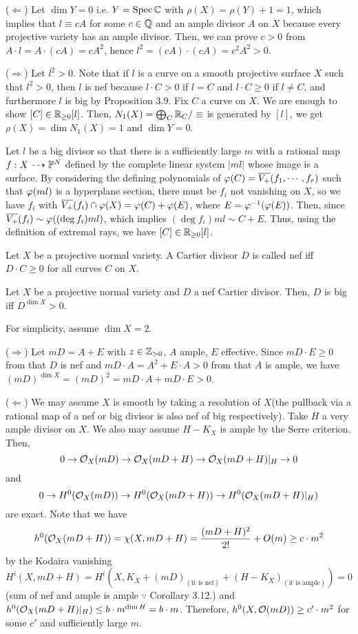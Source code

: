 \documentclass{../../small}
\begin{document}
\begin{pf}
($\Leftarrow$)
Let $\dim Y=0$ i.e. $Y=\Spec\C$ with $\rho(X)=\rho(Y)+1=1$, which implies that $l\equiv cA$ for some $c\in\Q$ and an ample divisor $A$ on $X$ because every projective variety has an ample divisor.
Then, we can prove $c>0$ from $A\cdot l=A\cdot(cA)=cA^2$, hence $l^2=(cA)\cdot(cA)=c^2A^2>0$.

($\Rightarrow$)
Let $l^2>0$.
Note that if $l$ is a curve on a smooth projective surface $X$ such that $l^2>0$, then $l$ is nef because $l\cdot C>0$ if $l=C$ and $l\cdot C\ge0$ if $l\ne C$, and furthermore $l$ is big by Proposition 3.9.
Fix $C$ a curve on $X$.
We are enough to show $[C]\in\R_{\ge0}[l]$.
Then, $N_1(X)=\bigoplus_C\R_C/\equiv$ is generated by $[l]$, we get $\rho(X)=\dim N_1(X)=1$ and $\dim Y=0$.

Let $l$ be a big divisor so that there is a sufficiently large $m$ with a rational map $f:X\dashrightarrow\P^N$ defined by the complete linear system $|ml|$ whose image is a surface.
By considering the defining polynomials of $\f(C)=\bar{V_+}(f_1,\cdots,f_r)$ such that $\f(ml)$ is a hyperplane section, there must be $f_i$ not vanishing on $X$, so we have $f_i$ with $\bar{V_+}(f_i)\cap\f(X)=\f(C)+\f(E)$, where $E=\f^{-1}(\f(E))$.
Then, since $\bar{V_+}(f_i)\sim\f((\deg f_i)ml)$, which implies $(\deg f_i)ml\sim C+E$.
Thus, using the definition of extremal rays, we have $[C]\in\R_{\ge0}[l]$.
\end{pf}

\setcounter{thm}{7}
\begin{defn}
Let $X$ be a projective normal variety.
A Cartier divisor $D$ is called nef iff $D\cdot C\ge0$ for all curves $C$ on $X$.
\end{defn}
\begin{prop}
Let $X$ be a projective normal variety and $D$ a nef Cartier divisor.
Then, $D$ is big iff $D^{\dim X}>0$.
\end{prop}


\begin{pf}
For simplicity, assume $\dim X=2$.

($\Rightarrow$)
Let $mD=A+E$ with $z\in\Z_{>0}$, $A$ ample, $E$ effective.
Since $mD\cdot E\ge0$ from that $D$ is nef and $mD\cdot A=A^2+E\cdot A>0$ from that $A$ is ample, we have $(mD)^{\dim X}=(mD)^2=mD\cdot A+mD\cdot E>0$.

($\Leftarrow$)
We may assume $X$ is smooth by taking a resolution of $X$(the pullback via a rational map of a nef or big divisor is also nef of big respectively).
Take $H$ a very ample divisor on $X$.
We also may assume $H-K_X$ is ample by the Serre criterion.
Then,
\[0\to\cO_X(mD)\to\cO_X(mD+H)\to\cO_X(mD+H)|_H\to0\]
and
\[0\to H^0(\cO_X(mD))\to H^0(\cO_X(mD+H))\to H^0(\cO_X(mD+H)|_H)\]
are exact.
Note that we have
\[h^0(\cO_X(mD+H))=\chi(X,mD+H)=\frac{(mD+H)^2}{2!}+O(m)\ge c\cdot m^2\]
by the Kodaira vanishing
\[H^i(X,mD+H)=H^i(X,K_X+(mD)_{(\text{it is nef})}+(H-K_X)_{(\text{it is ample})})=0\]
(sum of nef and ample is ample $\because$ Corollary 3.12.)
and $h^0(\cO_X(mD+H)|_H)\le b\cdot m^{\dim H}=b\cdot m$.
Therefore, $h^0(X,\cO(mD))\ge c'\cdot m^2$ for some $c'$ and sufficiently large $m$.
\end{pf}
\end{document}
